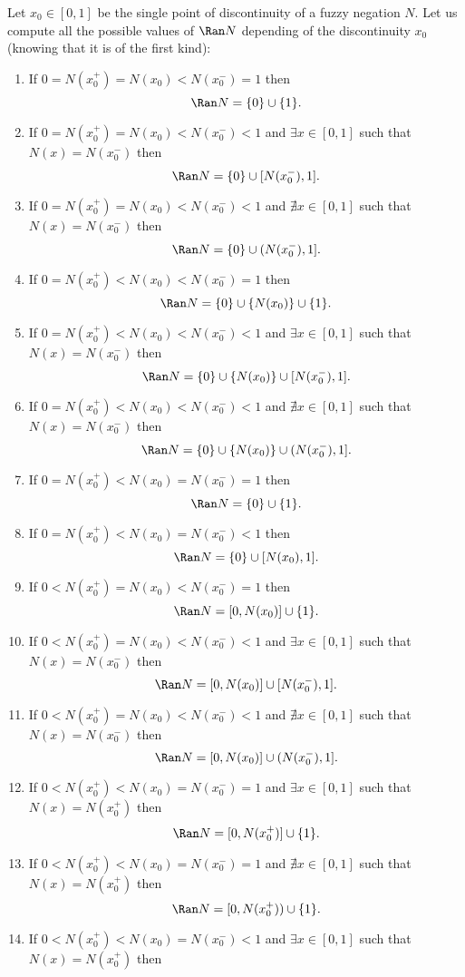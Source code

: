 \begin{remark}\label{remark:casesRanN}
	 Let $x_0 \in [0,1]$ be the single point of discontinuity of a fuzzy negation $N$. Let us compute all the possible values of $\Ran N$ depending of the discontinuity $x_0$ (knowing that it is of the first kind):
	\begin{enumerate}[label=\arabic*)]
		\item If $0=N(x_0^+)=N(x_0)<N(x_0^-)=1$ then 
		$$\Ran N = \{0\} \cup \{1\}.$$
		\item If $0=N(x_0^+)=N(x_0)<N(x_0^-)<1$ and $\exists x \in [0,1]$ such that $N(x)=N(x_0^-)$ then
		$$\Ran N = \{0\} \cup [N(x_0^-),1].$$
		\item If $0=N(x_0^+)=N(x_0)<N(x_0^-)<1$ and $\nexists x \in [0,1]$ such that $N(x)=N(x_0^-)$ then
		$$\Ran N = \{0\} \cup (N(x_0^-),1].$$
		\item If $0=N(x_0^+)<N(x_0)<N(x_0^-)=1$ then
		$$\Ran N = \{0\} \cup \{N(x_0)\} \cup \{1\}.$$
		\item If $0=N(x_0^+)<N(x_0)<N(x_0^-)<1$ and $\exists x \in [0,1]$ such that $N(x)=N(x_0^-)$ then
		$$\Ran N = \{0\} \cup \{N(x_0)\} \cup [N(x_0^-),1].$$
		\item If $0=N(x_0^+)<N(x_0)<N(x_0^-)<1$ and $\nexists x \in [0,1]$ such that $N(x)=N(x_0^-)$ then
		$$\Ran N = \{0\} \cup \{N(x_0)\} \cup (N(x_0^-),1].$$
		\item If $0=N(x_0^+)<N(x_0)=N(x_0^-)=1$ then
		$$\Ran N = \{0\} \cup \{1\}.$$
		\item If $0=N(x_0^+)<N(x_0)=N(x_0^-)<1$  then
		$$\Ran N = \{0\} \cup [N(x_0),1].$$
		\item If $0<N(x_0^+)=N(x_0)<N(x_0^-)=1$ then 
		$$\Ran N = [0,N(x_0)] \cup \{1\}.$$
		\item If $0<N(x_0^+)=N(x_0)<N(x_0^-)<1$ and $\exists x \in [0,1]$ such that $N(x)=N(x_0^-)$ then
		$$\Ran N = [0,N(x_0)] \cup [N(x_0^-),1].$$
		\item If $0<N(x_0^+)=N(x_0)<N(x_0^-)<1$ and $\nexists x \in [0,1]$ such that $N(x)=N(x_0^-)$ then
		$$\Ran N = [0,N(x_0)] \cup (N(x_0^-),1].$$
		\item If $0<N(x_0^+)<N(x_0)=N(x_0^-)=1$ and $\exists x \in [0,1]$ such that $N(x)=N(x_0^+)$ then
		$$\Ran N = [0,N(x_0^+)] \cup \{1\}.$$
		\item If $0<N(x_0^+)<N(x_0)=N(x_0^-)=1$ and $\nexists x \in [0,1]$ such that $N(x)=N(x_0^+)$ then
		$$\Ran N = [0,N(x_0^+)) \cup \{1\}.$$
		\item If $0<N(x_0^+)<N(x_0)=N(x_0^-)<1$ and $\exists x \in [0,1]$ such that $N(x)=N(x_0^+)$ then

\end{enumerate}
\end{remark}
